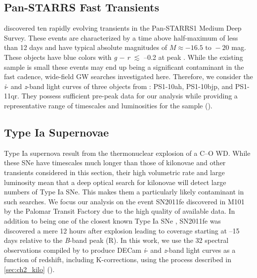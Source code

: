 \subsection{Pan-STARRS Fast Transients}
\label{sec:ch2_PSFast}
\citet{Drout+14} discovered ten rapidly evolving transients in the Pan-STARRS1 Medium Deep Survey. These events are characterized by a time above half-maximum of less than 12 days and have typical absolute magnitudes of $M \approx -16.5 \text{ to } -20$ mag. These objects have blue colors with {\em g} $-$ {\em r} $\lesssim$ --0.2 at peak \citep{Drout+14}. While the existing sample is small these events may end up being a significant contaminant in the fast cadence, wide-field GW searches investigated here. Therefore, we consider the {\em i}- and {\em z}-band light curves of three objects from \citet{Drout+14}: PS1-10ah, PS1-10bjp, and PS1-11qr. They possess sufficient pre-peak data for our analysis while providing a representative range of timescales and luminosities for the sample ().

\subsection{Type Ia Supernovae}
\label{sec:ch2_typeIa}
Type Ia supernova result from the thermonuclear explosion of a C--O WD. While these SNe have timescales much longer than those of kilonovae and other transients considered in this section, their high volumetric rate and large luminosity mean that a deep optical search for kilonovae will detect large numbers of Type Ia SNe. This makes them a particularly likely contaminant in such searches. We focus our analysis on the event SN2011fe discovered in M101 by the Palomar Transit Factory \citep{Nugent+11a} due to the high quality of available data. In addition to being one of the closest known Type Ia SNe \citep[$\mu = 29.04\pm0.19$,][]{ShappeeStanek11}, SN2011fe was discovered a mere 12 hours after explosion \citep{Nugent+11b} leading to coverage starting at --15 days relative to the {\em B}-band peak (R). In this work, we use the 32 spectral observations compiled by \citet{Pereira+13} to produce DECam {\em i}- and {\em z}-band light curves as a function of redshift, including K-corrections, using the process described in \cref{sec:ch2_kilo} ().

\clearpage
